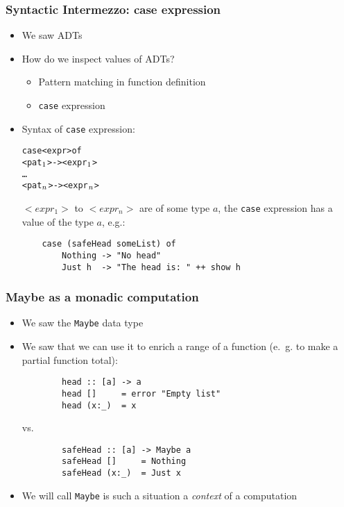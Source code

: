 \documentclass[final,handout]{beamer}
\begin{document}
\begin{frame}[fragile]
    \frametitle{Syntactic Intermezzo: case expression}

    \begin{itemize}
        \item We saw ADTs
        \item How do we inspect values of ADTs?
            \begin{itemize}
                \item Pattern matching in function definition
                \item \texttt{case} expression
            \end{itemize}
        \item<2-> Syntax of \texttt{case} expression:

\begin{alltt}
    case <expr> of
        <pat\(\sb{1}\)>      ->  <expr\(\sb{1}\)>
        \dots
        <pat\(\sb{n}\)>      ->  <expr\(\sb{n}\)>
\end{alltt}
        $<expr_1>$ to $<expr_n>$ are of some type $a$, the \texttt{case}
        expression has a value of the type $a$, e.g.:
  
\begin{verbatim}
    case (safeHead someList) of
        Nothing -> "No head"
        Just h  -> "The head is: " ++ show h
\end{verbatim}
    

    \end{itemize}

\end{frame}

\begin{frame}[fragile]
    \frametitle{Maybe as a monadic computation}
    
    \begin{itemize}
        \item We saw the \texttt{Maybe} data type
        \item We saw that we can use it to enrich a range of a function (e.~g. to
            make a partial function total):
\pause
    \begin{verbatim}
        head :: [a] -> a
        head []     = error "Empty list"
        head (x:_)  = x
    \end{verbatim}

    vs.

    \begin{verbatim}
        safeHead :: [a] -> Maybe a
        safeHead []     = Nothing
        safeHead (x:_)  = Just x
    \end{verbatim}

        \item<3-> We will call \texttt{Maybe} is such a situation a \emph{context}
            of a computation 
    \end{itemize}

\end{frame}
\end{document}
